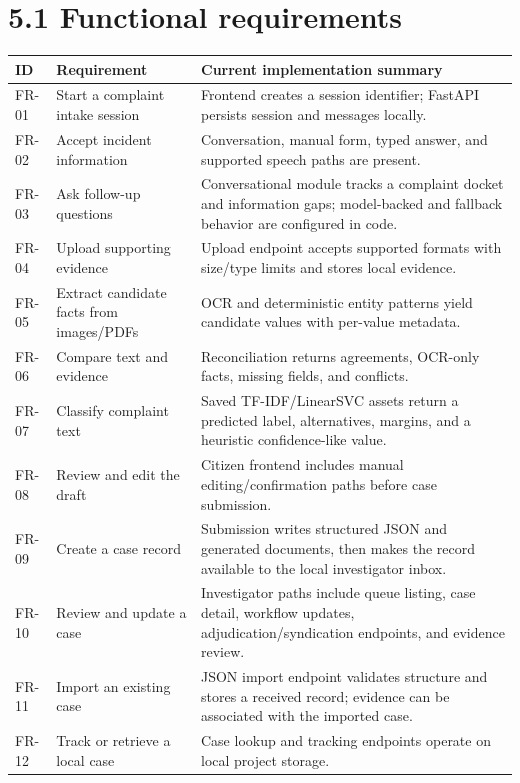 \documentclass[12pt,a4paper,oneside]{report}
\begin{document}
\section{5.1 Functional requirements}
\begin{longtable}{p{}p{}p{}}
\toprule
\textbf{ID} & \textbf{Requirement} & \textbf{Current implementation summary} \\
\midrule
FR-01 & Start a complaint intake session & Frontend creates a session identifier; FastAPI persists session and messages locally. \\
FR-02 & Accept incident information & Conversation, manual form, typed answer, and supported speech paths are present. \\
FR-03 & Ask follow-up questions & Conversational module tracks a complaint docket and information gaps; model-backed and fallback behavior are configured in code. \\
FR-04 & Upload supporting evidence & Upload endpoint accepts supported formats with size/type limits and stores local evidence. \\
FR-05 & Extract candidate facts from images/PDFs & OCR and deterministic entity patterns yield candidate values with per-value metadata. \\
FR-06 & Compare text and evidence & Reconciliation returns agreements, OCR-only facts, missing fields, and conflicts. \\
FR-07 & Classify complaint text & Saved TF-IDF/LinearSVC assets return a predicted label, alternatives, margins, and a heuristic confidence-like value. \\
FR-08 & Review and edit the draft & Citizen frontend includes manual editing/confirmation paths before case submission. \\
FR-09 & Create a case record & Submission writes structured JSON and generated documents, then makes the record available to the local investigator inbox. \\
FR-10 & Review and update a case & Investigator paths include queue listing, case detail, workflow updates, adjudication/syndication endpoints, and evidence review. \\
FR-11 & Import an existing case & JSON import endpoint validates structure and stores a received record; evidence can be associated with the imported case. \\
FR-12 & Track or retrieve a local case & Case lookup and tracking endpoints operate on local project storage. \\
\bottomrule
\end{longtable}
\end{document}
